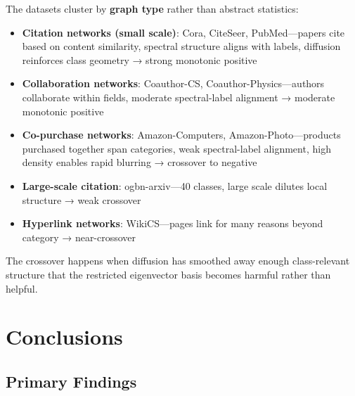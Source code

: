 \documentclass[11pt]{article}
\begin{document}
The datasets cluster by \textbf{graph type} rather than abstract statistics:

\begin{itemize}
\item \textbf{Citation networks (small scale)}: Cora, CiteSeer, PubMed—papers cite based on content similarity, spectral structure aligns with labels, diffusion reinforces class geometry → strong monotonic positive
\item \textbf{Collaboration networks}: Coauthor-CS, Coauthor-Physics—authors collaborate within fields, moderate spectral-label alignment → moderate monotonic positive
\item \textbf{Co-purchase networks}: Amazon-Computers, Amazon-Photo—products purchased together span categories, weak spectral-label alignment, high density enables rapid blurring → crossover to negative
\item \textbf{Large-scale citation}: ogbn-arxiv—40 classes, large scale dilutes local structure → weak crossover
\item \textbf{Hyperlink networks}: WikiCS—pages link for many reasons beyond category → near-crossover
\end{itemize}

The crossover happens when diffusion has smoothed away enough class-relevant structure that the restricted eigenvector basis becomes harmful rather than helpful.

\section{Conclusions}

\subsection{Primary Findings}
\end{document}
